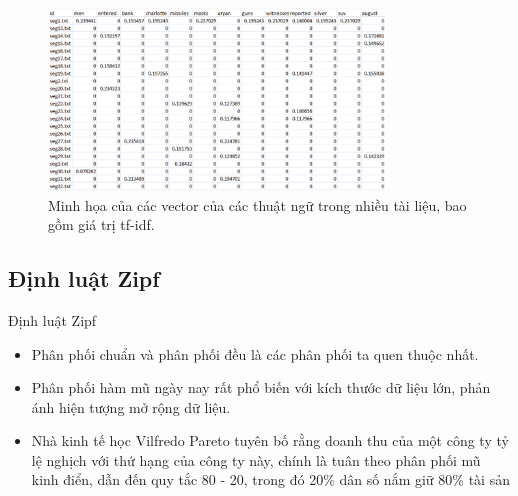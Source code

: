 \documentclass[10pt]{beamer}
\theoremstyle{remark}
\theoremstyle{definition}
\begin{document}
\begin{frame}
	\begin{figure}[h!]
        \centering
        \includegraphics[width=0.8\textwidth]{1.png}
        \caption{Minh họa của các vector của các thuật ngữ trong nhiều tài liệu, bao gồm giá trị tf-idf.}
        \label{fig:1}
    \end{figure}
\end{frame}

\subsection{Định luật Zipf}

\begin{frame}{Định luật Zipf}
	\begin{itemize}
		\item Phân phối chuẩn và phân phối đều là các phân phối ta quen thuộc nhất.
		\item Phân phối hàm mũ ngày nay rất phổ biến với kích thước dữ liệu lớn, phản ánh hiện tượng mở rộng dữ liệu.
		\item Nhà kinh tế học Vilfredo Pareto tuyên bố rằng doanh thu của một công ty tỷ lệ nghịch với thứ hạng của công ty này, chính là tuân theo phân phối mũ kinh điển,
		dẫn đến quy tắc 80 - 20, trong đó 20\% dân số nắm giữ 80\% tài sản
	\end{itemize}
	
\end{frame}
\end{document}
